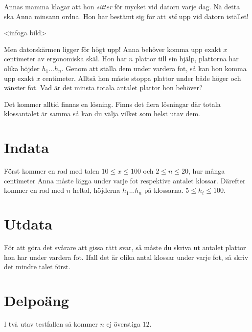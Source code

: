 Annas mamma klagar att hon \emph{sitter} för mycket vid datorn varje
dag. Nä detta ska Anna minsann ordna. Hon har bestämt sig för att
\emph{stå} upp vid datorn istället!

<infoga bild>

Men datorskärmen ligger för högt upp! Anna behöver komma upp exakt
$x$ centimeter av ergonomiska skäl. Hon har $n$ plattor till sin
hjälp, plattorna har olika höjder $h_1 \dots h_n$. Genom att ställa
dem under vardera fot, så kan hon komma upp exakt $x$ centimeter.
Alltså hon måste stoppa plattor under både höger och vänster fot.
Vad är det minsta totala antalet plattor hon behöver?

Det kommer alltid finnas en lösning. Finns det flera lösningar där
totala klossantalet är samma så kan du välja vilket som helst utav
dem.

\section*{Indata}

Först kommer en rad med talen $10 \leq x \leq 100$ och $2 \leq n \leq 20$, hur många centimeter Anna
måste lägga under varje fot respektive antalet klossar. Därefter kommer
en rad med $n$ heltal, höjderna $h_1 \dots h_n$ på klossarna. $5 \leq h_i \leq 100$.

\section*{Utdata}

För att göra det svårare att gissa rätt svar, så måste du skriva
ut antalet plattor hon har under vardera fot. Ifall det är olika antal
klossar under varje fot, så skriv det mindre talet först.

\section*{Delpoäng}

I två utav testfallen så kommer $n$ ej överstiga $12$.
